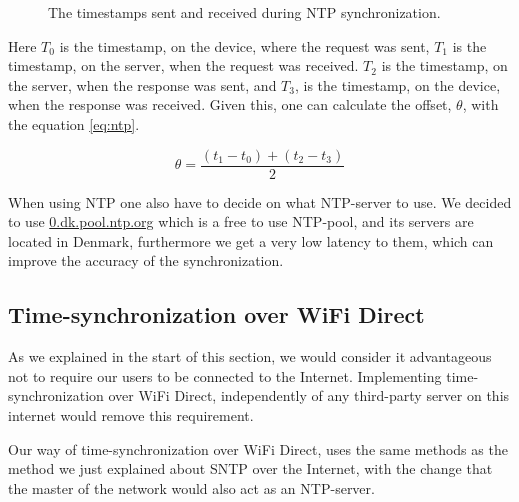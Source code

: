 \begin{figure}[htb]
    \centering
    \caption{The timestamps sent and received during \ac{NTP} synchronization.}
    \label{fig:ntp_packets}
\end{figure}

Here $T_0$ is the timestamp, on the device, where the request was sent, $T_1$ is the timestamp, on the \ac{server}, when the request was received.
$T_2$ is the timestamp, on the \ac{server}, when the response was sent, and $T_3$, is the timestamp, on the device, when the response was received.
Given this, one can calculate the offset, $\theta$, with the equation \ref{eq:ntp}.

\begin{equation}\label{eq:ntp}
    \theta = \frac{(t_1 - t_0)+(t_2 - t_3)}{2}
\end{equation}

When using \ac{NTP} one also have to decide on what \ac{NTP}-server to use.
We decided to use \url{0.dk.pool.ntp.org} which is a free to use \ac{NTP}-pool, and its servers are located in Denmark, furthermore we get a very low latency to them, which can improve the accuracy of the synchronization.

\subsection{Time-synchronization over WiFi Direct}
As we explained in the start of this section, we would consider it advantageous not to require our users to be connected to the Internet.
Implementing time-synchronization over WiFi Direct, independently of any third-party server on this internet would remove this requirement.

Our way of time-synchronization over WiFi Direct, uses the same methods as the method we just explained about \ac{SNTP} over the Internet, with the change that the master of the network would also act as an \ac{NTP}-server.

